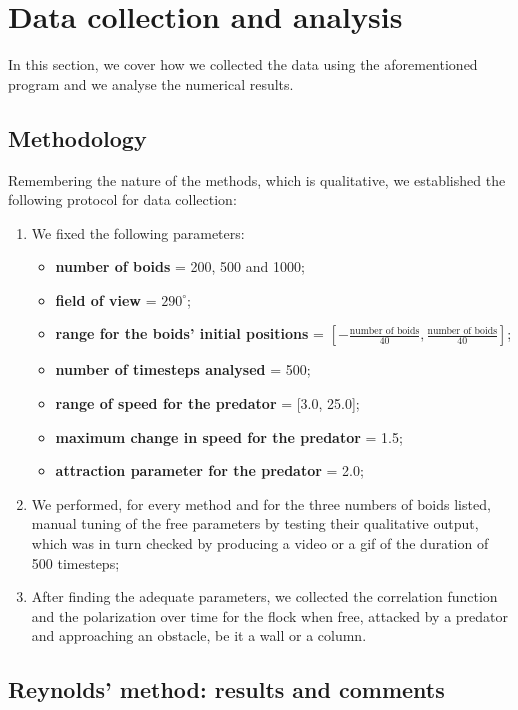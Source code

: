 \section{Data collection and analysis}
In this section, we cover how we collected the data using the aforementioned program and we analyse the numerical results.
\subsection{Methodology}
Remembering the nature of the methods, which is qualitative, we established the following protocol for data collection:
\begin{enumerate}
    \item We fixed the following parameters:
          \begin{itemize}
              \item \textbf{number of boids} = 200, 500 and 1000;
              \item \textbf{field of view} = $290^{\circ}$;
              \item \textbf{range for the boids' initial positions} = $[-\frac{\text{number of boids}}{40}, \frac{\text{number of boids}}{40}]$;
              \item \textbf{number of timesteps analysed} = 500;
              \item \textbf{range of speed for the predator} = [3.0, 25.0];
              \item \textbf{maximum change in speed for the predator} = 1.5;
              \item \textbf{attraction parameter for the predator} = 2.0;
          \end{itemize}
    \item We performed, for every method and for the three numbers of boids listed, manual tuning of the free parameters by testing their qualitative output, which was in turn checked by producing a video or a gif of the duration of 500 timesteps;
    \item After finding the adequate parameters, we collected the correlation function and the polarization over time for the flock when free, attacked by a predator and approaching an obstacle, be it a wall or a column.
\end{enumerate}
\subsection{Reynolds' method: results and comments}
